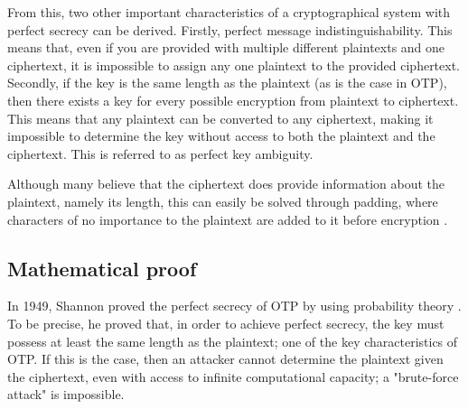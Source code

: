 \documentclass[12pt]{report}
\begin{document}
From this, two other important characteristics of a cryptographical system with perfect secrecy can be derived. Firstly, perfect message indistinguishability. This means that, even if you are provided with multiple different plaintexts and one ciphertext, it is impossible to assign any one plaintext to the provided ciphertext. Secondly, if the key is the same length as the plaintext (as is the case in OTP), then there exists a key for every possible encryption from plaintext to ciphertext. This means that any plaintext can be converted to any ciphertext, making it impossible to determine the key without access to both the plaintext and the ciphertext. This is referred to as perfect key ambiguity.		%

Although many believe that the ciphertext does provide information about the plaintext, namely its length, this can easily be solved through padding, where characters of no importance to the plaintext are added to it before encryption \cite{HutSix}.

\subsection{Mathematical proof}



In 1949, Shannon proved the perfect secrecy of OTP by using probability theory \cite{ShannonOTP}. To be precise, he proved that, in order to achieve perfect secrecy, the key must possess at least the same length as the plaintext; one of the key characteristics of OTP. If this is the case, then an attacker cannot determine the plaintext given the ciphertext, even with access to infinite computational capacity; a "brute-force attack" is impossible.

\end{document}
